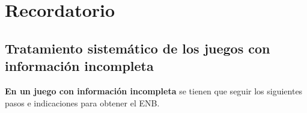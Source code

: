 \documentclass[12pt]{article}
\begin{document}




\section*{Recordatorio}
\subsection*{Tratamiento sistemático de los juegos con información incompleta}
\textbf{En un juego con información incompleta} se tienen que seguir los siguientes pasos e indicaciones para obtener el ENB.
\end{document}

